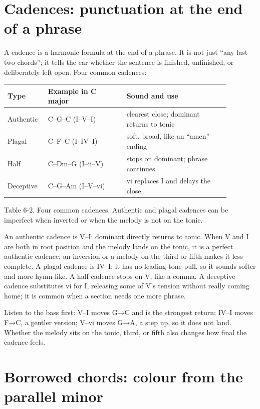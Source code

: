\section{Cadences: punctuation at the end of a phrase}

A cadence is a harmonic formula at the end of a phrase. It is not just ``any last two chords''; it tells the ear whether the sentence is finished, unfinished, or deliberately left open. Four common cadences:

\begin{center}
\small
\begin{tabular}{p{0.14\linewidth}p{0.32\linewidth}p{0.42\linewidth}}
\toprule
Type & Example in C major & Sound and use \\
\midrule
Authentic & C--G--C (I--V--I) & clearest close; dominant returns to tonic \\
Plagal & C--F--C (I--IV--I) & soft, broad, like an ``amen'' ending \\
Half & C--Dm--G (I--ii--V) & stops on dominant; phrase continues \\
Deceptive & C--G--Am (I--V--vi) & vi replaces I and delays the close \\
\bottomrule
\end{tabular}

Table 6-2. Four common cadences. Authentic and plagal cadences can be imperfect when inverted or when the melody is not on the tonic.
\end{center}

An authentic cadence is V--I: dominant directly returns to tonic. When V and I are both in root position and the melody lands on the tonic, it is a perfect authentic cadence; an inversion or a melody on the third or fifth makes it less complete. A plagal cadence is IV--I; it has no leading-tone pull, so it sounds softer and more hymn-like. A half cadence stops on V, like a comma. A deceptive cadence substitutes vi for I, releasing some of V's tension without really coming home; it is common when a section needs one more phrase.

Listen to the bass first: V--I moves G→C and is the strongest return; IV--I moves F→C, a gentler version; V--vi moves G→A, a step up, so it does not land. Whether the melody sits on the tonic, third, or fifth also changes how final the cadence feels.

\section{Borrowed chords: colour from the parallel minor}

